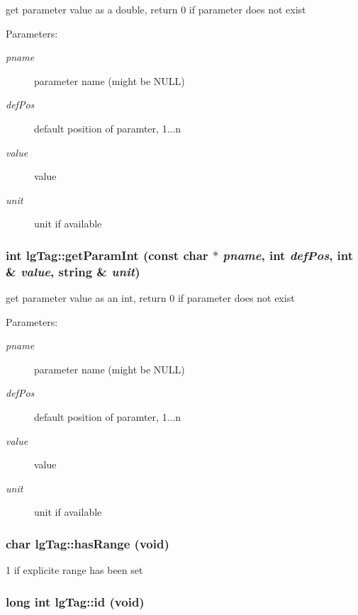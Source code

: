 get parameter value as a double, return 0 if parameter does not exist 

\begin{Desc}
\item[Parameters: ]\par
\begin{description}
\item[{\em 
pname}]parameter name (might be NULL) \item[{\em 
def\-Pos}]default position of paramter, 1...n \item[{\em 
value}]value \item[{\em 
unit}]unit if available \end{description}
\end{Desc}
\subsubsection{\setlength{\rightskip}{0pt plus 5cm}int lg\-Tag::get\-Param\-Int (const char $\ast$ {\em pname}, int {\em def\-Pos}, int \& {\em value}, string \& {\em unit})}\label{classlgTag_a2}


get parameter value as an int, return 0 if parameter does not exist 

\begin{Desc}
\item[Parameters: ]\par
\begin{description}
\item[{\em 
pname}]parameter name (might be NULL) \item[{\em 
def\-Pos}]default position of paramter, 1...n \item[{\em 
value}]value \item[{\em 
unit}]unit if available \end{description}
\end{Desc}
\subsubsection{\setlength{\rightskip}{0pt plus 5cm}char lg\-Tag::has\-Range (void)}\label{classlgTag_a22}


1 if explicite range has been set 

\subsubsection{\setlength{\rightskip}{0pt plus 5cm}long int lg\-Tag::id (void)\hspace{0.3cm}{\tt  [inline]}}\label{classlgTag_a10}


